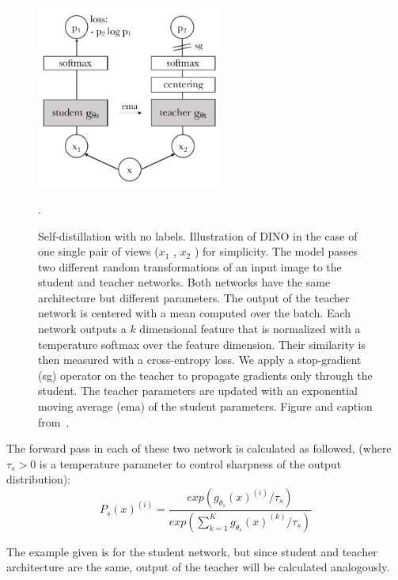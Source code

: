 \begin{figure}[htb]
    \centering
    \includegraphics[width=0.55\textwidth]{pictures/dino-structure}\\
    \caption[Structure of DINO]{Self-distillation with no labels. Illustration of DINO in the case of one single pair of views ($x_1$ , $x_2$ ) for simplicity. The model passes two different random transformations of an input image to the student and teacher networks. Both networks have the same architecture but different parameters. The output of the teacher network is centered with a mean computed over the batch. Each network outputs a $k$ dimensional feature that is normalized with a temperature softmax over the feature dimension. Their similarity is then measured with a cross-entropy loss. We apply a stop-gradient (sg) operator on the teacher to propagate gradients only through the student. The teacher parameters are updated with an exponential moving average (ema) of the student parameters. Figure and caption from~\autocite{Caron2021}.}.
    \label{fig:dino-structure}
\end{figure}

The forward pass in each of these two network is calculated as followed, (where $\tau_s > 0$ is a temperature parameter to control sharpness of the output distribution):
\begin{equation}
    P_s(x)^{(i)} = \frac{exp(g_{\theta_s}(x)^{(i)} / \tau_s)}{exp(\sum^K_{k=1}g_{\theta_s}(x)^{(k)} / \tau_s)}
    \label{eq:forward-pass}
\end{equation}

The example given is for the student network, but since student and teacher architecture are the same, output of the teacher will be calculated analogously.

